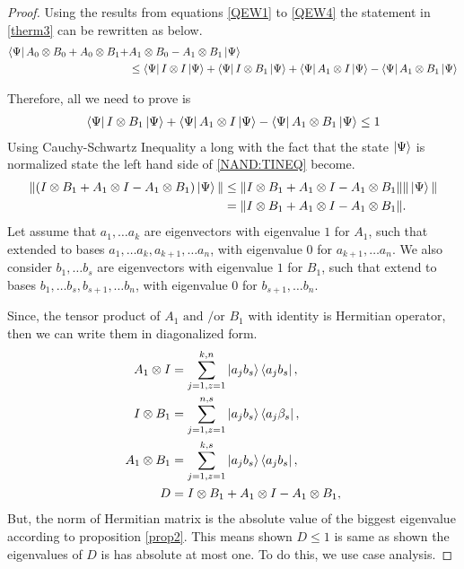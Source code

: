 \begin{proof}
Using the results from equations \ref{QEW1} to \ref{QEW4} the statement in \ref{therm3} can be rewritten as below.
\begin{align*}
\bra{\Psi} A_0\otimes B_0+A_0\otimes B_1+&A_1\otimes B_0-A_1\otimes B_1 \ket{\Psi}\\&\leq \bra{\Psi} I\otimes I\ket{\Psi}+\bra{\Psi}I\otimes B_1\ket{\Psi}+\bra{\Psi}A_1\otimes I\ket{\Psi}-\bra{\Psi}A_1\otimes B_1 \ket{\Psi}
\end{align*}

Therefore, all we need to prove is
\begin{align}
\bra{\Psi}I\otimes B_1\ket{\Psi}+\bra{\Psi}A_1\otimes I\ket{\Psi}-\bra{\Psi}A_1\otimes B_1 \ket{\Psi} \leq 1\label{NAND:TINEQ}
\end{align} 
Using  Cauchy-Schwartz Inequality a long with the fact that the state $\ket{\Psi}$ is normalized state the left hand side of \ref{NAND:TINEQ} become.
\begin{align}\label{Proof}
\|( I\otimes B_1+A_1\otimes I-A_1\otimes B_1 )\ket{\Psi} \| 
& \leq \| I\otimes B_1+A_1\otimes I-A_1\otimes B_1\| \| \ket{\Psi} \|\nonumber\\
&=\| I\otimes B_1+A_1\otimes I-A_1\otimes B_1\|.
\end{align}
Let assume that  $a_1,\dots a_k$ are eigenvectors with eigenvalue $1$ for $A_1$, such that extended to bases  $a_1,\dots a_k,a_{k+1},\dots a_{n}$, with eigenvalue $0$ for $a_{k+1},\dots a_{n}$. We also consider
$b_1,\dots b_s$ are eigenvectors with eigenvalue $1$ for $B_1$, such that extend to bases $b_1,\dots b_s,b_{s+1},\dots b_n$, with eigenvalue $0$ for $b_{s+1},\dots b_{n}$. 

Since, the tensor product of $A_1 \text{ and /or } B_1$  with identity is Hermitian operator, then we can write them in diagonalized form.
\begin{align}
A_1\otimes I&=\sum_{j=1,z=1}^{k,n}\ket{a_jb _s}\bra{a_jb _s},\\
 I\otimes B_1&=\sum_{j=1,z=1}^{n,s}\ket{a_jb _s}\bra{a_j\beta _s},\\
  A_1\otimes B_1&=\sum_{j=1,z=1}^{k,s}\ket{a_jb _s}\bra{a_jb_s},\\
  D&=I\otimes B_1+A_1\otimes I-A_1\otimes B_1,
\end{align}
But, the norm of  Hermitian matrix is the absolute value of the biggest eigenvalue according to proposition \ref{prop2}. This means shown $D\leq 1$ is same as shown the eigenvalues of $D$ is has absolute  at most one. To do this, we use case analysis.


\end{proof}
